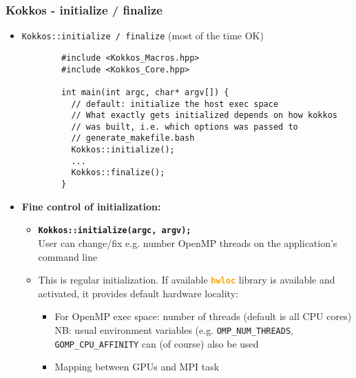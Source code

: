 \begin{frame}[fragile=singleslide]
  \frametitle{Kokkos - initialize / finalize}

  \begin{itemize}
  \item \texttt{Kokkos::initialize / finalize} (most of the time OK)
    {\small\begin{verbatim}
        #include <Kokkos_Macros.hpp>
        #include <Kokkos_Core.hpp>
        
        int main(int argc, char* argv[]) {
          // default: initialize the host exec space
          // What exactly gets initialized depends on how kokkos
          // was built, i.e. which options was passed to
          // generate_makefile.bash
          Kokkos::initialize();
          ...
          Kokkos::finalize();
        }
      \end{verbatim}
    }
  \item \textbf{Fine control of initialization:}
    \begin{itemize}
    \item \texttt{\bf Kokkos::initialize(argc, argv);}\\
      User can change/fix e.g. number OpenMP threads on the application's command line
    \item This is regular initialization. If available \textcolor{orange}{\textbf{\texttt{hwloc}}} library is available and activated, it provides default hardware locality:
      \begin{itemize}
      \item For OpenMP exec space: number of threads (default is all CPU cores)\\
        NB: usual environment variables (e.g. \texttt{OMP\_NUM\_THREADS}, \texttt{GOMP\_CPU\_AFFINITY} can (of course) also be used
      \item Mapping between GPUs and MPI task
      \end{itemize}
    \end{itemize}
  \end{itemize}
  
\end{frame}


